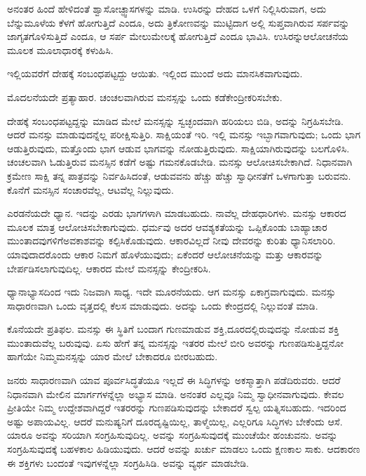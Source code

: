 \vskip 6pt

ಅನಂತರ ಹಿಂದೆ ಹೇಳಿದಂತೆ ಶ್ವಾಸೋಚ್ಫ್ವಾಸಗಳನ್ನು ಮಾಡಿ. ಉಸಿರನ್ನು ದೇಹದ ಒಳಗೆ ನಿಲ್ಲಿಸಿರುವಾಗ, ಅದು ಬೆನ್ನುಮೂಳೆಯ ಕೆಳಗೆ ಹೋಗುತ್ತಿದೆ ಎಂದೂ, ಅದು ತ್ರಿಕೋಣವನ್ನು ಮುಟ್ಟಿದಾಗ ಅಲ್ಲಿ ಸುಪ್ತವಾಗಿರುವ ಸರ್ಪವನ್ನು ಜಾಗೃತಗೊಳಿಸುತ್ತಿದೆ ಎಂದೂ, ಆ ಸರ್ಪ ಮೇಲುಮೇಲಕ್ಕೆ ಹೋಗುತ್ತಿದೆ ಎಂದೂ ಭಾವಿಸಿ. ಉಸಿರನ್ನು\break ಆಲೋಚನೆಯ ಮೂಲಕ ಮೂಲಾಧಾರಕ್ಕೆ ಕಳುಹಿಸಿ.

\vskip 6pt

ಇಲ್ಲಿಯವರೆಗೆ ದೇಹಕ್ಕೆ ಸಂಬಂಧಪಟ್ಟದ್ದು ಆಯಿತು. ಇಲ್ಲಿಂದ ಮುಂದೆ ಅದು ಮಾನಸಿಕವಾಗುವುದು.

\vskip 6pt

ಮೊದಲನೆಯದೇ ಪ್ರತ್ಯಾಹಾರ. ಚಂಚಲವಾಗಿರುವ ಮನಸ್ಸನ್ನು ಒಂದು ಕಡೆ\break ಕೇಂದ್ರೀಕರಿಸಬೇಕು.

\vskip 6pt

ದೇಹಕ್ಕೆ ಸಂಬಂಧಪಟ್ಟದ್ದನ್ನು ಮಾಡಿದ ಮೇಲೆ ಮನಸ್ಸನ್ನು ಸ್ವಚ್ಛಂದವಾಗಿ ಹರಿಯಲು ಬಿಡಿ, ಅದನ್ನು ನಿಗ್ರಹಿಸಬೇಡಿ. ಆದರೆ ಮನಸ್ಸು ಮಾಡುವುದನ್ನೆಲ್ಲ ಪರೀಕ್ಷಿಸುತ್ತಿರಿ. ಸಾಕ್ಷಿಯಂತೆ ಇರಿ. ಇಲ್ಲಿ ಮನಸ್ಸು ಇಬ್ಭಾಗವಾಗುವುದು; ಒಂದು ಭಾಗ ಆಡುತ್ತಿರುವುದು, ಮತ್ತೊಂದು ಭಾಗ ಆಡುವ ಭಾಗವನ್ನು ನೋಡುತ್ತಿರುವುದು. ಸಾಕ್ಷಿಯಾಗಿರುವುದನ್ನು ಬಲಗೊಳಿಸಿ. ಚಂಚಲವಾಗಿ ಓಡುತ್ತಿರುವ ಮನಸ್ಸಿನ ಕಡೆಗೆ ಅಷ್ಟು ಗಮನಕೊಡಬೇಡಿ. ಮನಸ್ಸು ಆಲೋಚಿಸಬೇಕಾಗಿದೆ. ನಿಧಾನವಾಗಿ ಕ್ರಮೇಣ ಸಾಕ್ಷಿ ತನ್ನ ಪಾತ್ರವನ್ನು ನಿರ್ವಹಿಸಿದಂತೆ, ಆಡುವವನು ಹೆಚ್ಚು ಹೆಚ್ಚು ಸ್ವಾಧೀನತೆಗೆ ಒಳಗಾಗುತ್ತಾ ಬರುವನು. ಕೊನೆಗೆ ಮನಸ್ಸಿನ ಸಂಚಾರವೆಲ್ಲ, ಆಟವೆಲ್ಲ ನಿಲ್ಲುವುದು.

\vskip 6pt

ಎರಡನೆಯದೇ ಧ್ಯಾನ. ಇದನ್ನು ಎರಡು ಭಾಗಗಳಾಗಿ ಮಾಡಬಹುದು. ನಾವೆಲ್ಲ ದೇಹಧಾರಿಗಳು. ಮನಸ್ಸು ಆಕಾರದ ಮೂಲಕ ಮಾತ್ರ ಆಲೋಚಿಸಬೇಕಾಗುವುದು. ಧರ್ಮವು ಅದರ ಆವಶ್ಯಕತೆಯನ್ನು ಒಪ್ಪಿಕೊಂಡು ಬಾಹ್ಯಾಚಾರ ಮುಂತಾದವುಗಳಿಗೆ\break ಅವಕಾಶವನ್ನು ಕಲ್ಪಿಸಿಕೊಡುವುದು. ಆಕಾರವಿಲ್ಲದೆ ನೀವು ದೇವರನ್ನು ಕುರಿತು ಧ್ಯಾನಿಸಲಾರಿರಿ. ಯಾವುದಾದರೊಂದು ಆಕಾರ ನಿಮಗೆ ಹೊಳೆಯುವುದು; ಏಕೆಂದರೆ ಆಲೋಚನೆ\-ಯನ್ನು ಮತ್ತು ಆಕಾರವನ್ನು ಬೇರ್ಪಡಿಸಲಾಗುವುದಿಲ್ಲ. ಆಕಾರದ ಮೇಲೆ ಮನಸ್ಸನ್ನು ಕೇಂದ್ರೀಕರಿಸಿ.

ಧ್ಯಾನಾಭ್ಯಾಸದಿಂದ ಇದು ನಿಜವಾಗಿ ಸಾಧ್ಯ. ಇದೇ ಮೂರನೆಯದು. ಆಗ ಮನಸ್ಸು ಏಕಾಗ್ರವಾಗುವುದು. ಮನಸ್ಸು ಸಾಧಾರಣವಾಗಿ ಒಂದು ವೃತ್ತದಲ್ಲಿ ಕೆಲಸ ಮಾಡುವುದು. ಅದನ್ನು ಒಂದು ಕೇಂದ್ರದಲ್ಲಿ ನಿಲ್ಲುವಂತೆ ಮಾಡಿ.

ಕೊನೆಯದೇ ಪ್ರತಿಫಲ. ಮನಸ್ಸು ಈ ಸ್ಥಿತಿಗೆ ಬಂದಾಗ ಗುಣಮಾಡುವ ಶಕ್ತಿ,\break ದೂರದಲ್ಲಿರುವುದನ್ನು ನೋಡುವ ಶಕ್ತಿ ಮುಂತಾದುವೆಲ್ಲ ಬರುವುವು. ಏಸು ಹೇಗೆ ತನ್ನ ಮನಸ್ಸನ್ನು ಇತರರ ಮೇಲೆ ಬೀರಿ ಅವರನ್ನು ಗುಣಪಡಿಸುತ್ತಿದ್ದನೋ ಹಾಗೆಯೇ ನಿಮ್ಮ\break ಮನಸ್ಸನ್ನು ಯಾರ ಮೇಲೆ ಬೇಕಾದರೂ ಬೀರಬಹುದು.

ಜನರು ಸಾಧಾರಣವಾಗಿ ಯಾವ ಪೂರ್ವಸಿದ್ಧತೆಯೂ ಇಲ್ಲದೆ ಈ ಸಿದ್ಧಿಗಳನ್ನು ಅಕಸ್ಮಾತ್ತಾಗಿ ಪಡೆದಿರುವರು. ಆದರೆ ನಿಧಾನವಾಗಿ ಮೇಲಿನ ಮಾರ್ಗಗಳನ್ನೆಲ್ಲಾ ಅಭ್ಯಾಸ ಮಾಡಿ. ಅನಂತರ ಎಲ್ಲವೂ ನಿಮ್ಮ ಸ್ವಾಧೀನವಾಗುವುದು. ಕೇವಲ ಪ್ರೀತಿಯೇ ನಿಮ್ಮ ಉದ್ದೇಶವಾಗಿದ್ದರೆ ಇತರರನ್ನು ಗುಣಪಡಿಸುವುದನ್ನು ಬೇಕಾದರೆ ಸ್ವಲ್ಪ ಯತ್ನಿಸಬಹುದು. ಇದರಿಂದ ಅಷ್ಟು ಅಪಾಯವಿಲ್ಲ. ಆದರೆ ಮನುಷ್ಯನಿಗೆ ದೂರದೃಷ್ಟಿಯಿಲ್ಲ, ತಾಳ್ಮೆಯಿಲ್ಲ, ಎಲ್ಲರಿಗೂ ಸಿದ್ಧಿಗಳು ಬೇಕೆಂದು ಆಸೆ. ಯಾರೂ ಅವನ್ನು ಸರಿಯಾಗಿ ಸಂಗ್ರಹಿಸುವುದಿಲ್ಲ. ಅವನ್ನು ಸಂಗ್ರಹಿಸುವುದಕ್ಕೆ ಮುಂಚೆಯೇ ಹಂಚುವನು. ಅವನ್ನು ಸಂಗ್ರಹಿಸುವುದಕ್ಕೆ ಬಹಳಕಾಲ ಹಿಡಿಯುವುದು. ಆದರೆ ಅವನ್ನು ಖರ್ಚು ಮಾಡಲು ಒಂದು ಕ್ಷಣಕಾಲ ಸಾಕು. ಆದಕಾರಣ ಈ ಶಕ್ತಿಗಳು ಬಂದಂತೆ ಇವುಗಳನ್ನೆಲ್ಲಾ ಸಂಗ್ರಹಿಸಿಡಿ. ಅವನ್ನು ವ್ಯರ್ಥ ಮಾಡಬೇಡಿ.

